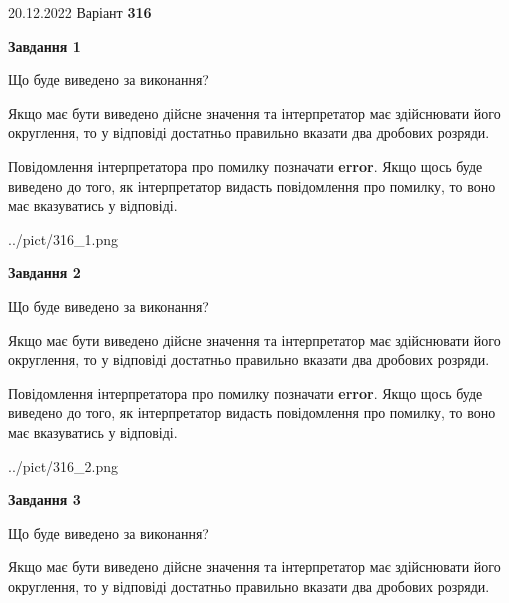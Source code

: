 \documentclass[12pt, ukrainian]{article}
\begin{document}
{20.12.2022 Варіант \No \textbf { 316 }\par}
{
\begin {Large}

{\begin {center}\textbf{Завдання 1}\end {center}}\par
Що буде виведено за виконання? \par

Якщо має бути виведено дійсне значення та інтерпретатор має здійснювати його округлення, 
то у відповіді достатньо правильно вказати два дробових розряди.

Повідомлення інтерпретатора про помилку позначати \textbf{error}.
Якщо щось буде виведено до того, як інтерпретатор видасть повідомлення про помилку, 
то воно має вказуватись у відповіді. \par

\begin{center}
	{../pict/316_1.png}
\end{center}
\newpage

{\begin {center}\textbf{Завдання 2}\end {center}}\par
Що буде виведено за виконання? \par

Якщо має бути виведено дійсне значення та інтерпретатор має здійснювати його округлення, 
то у відповіді достатньо правильно вказати два дробових розряди.

Повідомлення інтерпретатора про помилку позначати \textbf{error}.
Якщо щось буде виведено до того, як інтерпретатор видасть повідомлення про помилку, 
то воно має вказуватись у відповіді. \par

\begin{center}
	{../pict/316_2.png}
\end{center}
\newpage

{\begin {center}\textbf{Завдання 3}\end {center}}\par
Що буде виведено за виконання? \par

Якщо має бути виведено дійсне значення та інтерпретатор має здійснювати його округлення, 
то у відповіді достатньо правильно вказати два дробових розряди.


\end{Large}}
\end{document}
